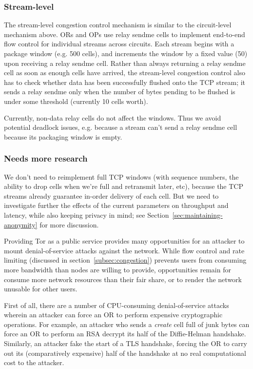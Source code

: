 \documentclass[times,10pt,twocolumn]{article}
\begin{document}
\subsubsection{Stream-level}

The stream-level congestion control mechanism is similar to the
circuit-level mechanism above. ORs and OPs use relay sendme cells
to implement end-to-end flow control for individual streams across
circuits. Each stream begins with a package window (e.g. 500 cells),
and increments the window by a fixed value (50) upon receiving a relay
sendme cell. Rather than always returning a relay sendme cell as soon
as enough cells have arrived, the stream-level congestion control also
has to check whether data has been successfully flushed onto the TCP
stream; it sends a relay sendme only when the number of bytes pending
to be flushed is under some threshold (currently 10 cells worth).

Currently, non-data relay cells do not affect the windows. Thus we
avoid potential deadlock issues, e.g. because a stream can't send a
relay sendme cell because its packaging window is empty.

\subsubsection{Needs more research}

We don't need to reimplement full TCP windows (with sequence numbers,
the ability to drop cells when we're full and retransmit later, etc),
because the TCP streams already guarantee in-order delivery of each
cell. But we need to investigate further the effects of the current
parameters on throughput and latency, while also keeping privacy in mind;
see Section~\ref{sec:maintaining-anonymity} for more discussion.


\label{subsec:dos}

Providing Tor as a public service provides many opportunities for an
attacker to mount denial-of-service attacks against the network.  While
flow control and rate limiting (discussed in
section~\ref{subsec:congestion}) prevents users from consuming more
bandwidth than nodes are willing to provide, opportunities remain for
consume more network resources than their fair share, or to render the
network unusable for other users.

First of all, there are a number of CPU-consuming denial-of-service
attacks wherein an attacker can force an OR to perform expensive
cryptographic operations.  For example, an attacker who sends a
\emph{create} cell full of junk bytes can force an OR to perform an RSA
decrypt its half of the Diffie-Helman handshake.  Similarly, an attacker
fake the start of a TLS handshake, forcing the OR to carry out its
(comparatively expensive) half of the handshake at no real computational
cost to the attacker.
\end{document}
